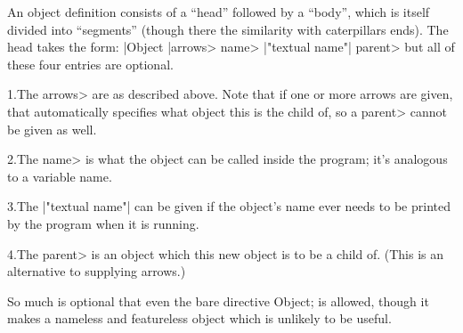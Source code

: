 An object definition consists of a ``head'' followed by a ``body'', which is
itself divided into ``segments'' (though there the similarity with caterpillars
ends).  The head takes the form:
\begindisplay
    |Object |\<arrows> \<name> |"textual name"| \<parent>\cr
\enddisplay
but all of these four entries are optional.
\item{1.}The \<arrows> are as described above.  Note that if one or more
arrows are given, that automatically specifies what object this is the child
of, so a \<parent> cannot be given as well.
\item{2.}The \<name> is what the object can be called inside the program;
it's analogous to a variable name.
\item{3.}The |"textual name"| can be given if the object's name ever needs
to be printed by the program when it is running.
\item{4.}The \<parent> is an object which this new object is to be a child
of.  (This is an alternative to supplying arrows.)
\medskip\par\noindent
So much is optional that even the bare directive
\beginstt
    Object;
\endtt
is allowed, though it makes a nameless and featureless object
which is unlikely to be useful.


